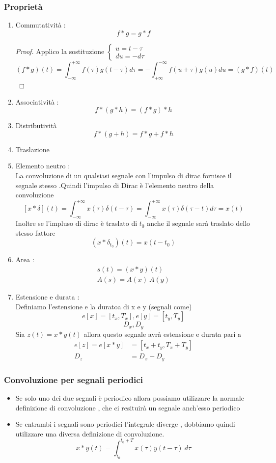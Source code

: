 \documentclass{article}
\theoremstyle{definition}
\newcommand{\intinf}{\int_{-\infty}^{+\infty}}
\begin{document}
\subsubsection{Proprietà}
\begin{enumerate}
	\item Commutatività : \\
	$$f*g=g*f$$
	\begin{proof}
		Applico la sostituzione $\begin{cases}
			u=t-\tau\\
			du=-d\tau
 		\end{cases}$
		$$(f*g)(t)=\intinf f(\tau)g(t-\tau)d\tau= -\int_{+\infty}^{-\infty}f(u+\tau)g(u)du=(g*f)(t)$$
	\end{proof}
	\item Associatività : \\
	$$f * (g*h)=(f*g)*h$$
	\item Distributività
	$$f*(g+h)=f*g+f*h$$
	\item Traslazione
	\item Elemento neutro : \\
	La convoluzione di un qualsiasi segnale con l'impulso di dirac fornisce il segnale stesso .Quindi l'impulso di Dirac è l'elemento neutro della convoluzione 
	$$\left[x*\delta\right](t)=\intinf x(\tau)\delta(t-\tau)=\intinf x(\tau)\delta(\tau-t)d\tau=x(t)$$
	Inoltre se l'impluso di dirac è traslato di $t_0$ anche il segnale sarà traslato dello stesso fattore 
	$$(x*\delta_{t_0})(t)=x(t-t_0)$$
	\item Area : \\
	\begin{align*}
		s(t)=(x*y)(t) \\
		A(s)=A(x) \ A(y)
	\end{align*}
	\item Estensione e durata :\\
	Definiamo l'estensione  e la duratoa di x e y (segnali come) $$e\left[x\right]=\left[t_x,T_x\right] , e\left[y\right]=\left[t_y,T_y\right] $$ $$D_x,D_y$$
	Sia $z(t)=x*y(t)$  allora questo segnale avrà estensione e durata pari a 
	\begin{align*}
		e\left[z\right]=e [x*y] &= [t_x+t_y,T_x+T_y ]\\
		D_z&=D_x+D_y
	\end{align*}
\end{enumerate}
\subsubsection{Convoluzione per segnali periodici}
\begin{itemize}
	\item Se solo uno dei due segnali è periodico allora possiamo utilizzare la normale definizione di convoluzione , che ci resituirà un segnale anch'esso periodico 
	\item Se entrambi i segnali sono periodici l'integrale diverge , dobbiamo quindi utilizzare una diversa definizione di convoluzione. 
	$$x*y(t)=\int_{t_0}^{t_0+T}x(\tau)y(t-\tau) \ d\tau$$
\end{itemize}
\end{document}
